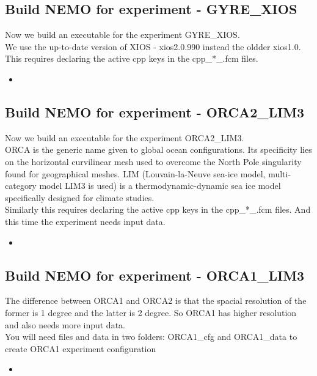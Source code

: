 \documentclass[11pt]{article}
\newcommand{\insertcode}[2]{\begin{itemize}\item[]\end{itemize}} %
\begin{document}
\subsection{Build NEMO for experiment - GYRE\_XIOS}
Now we build an executable for the experiment GYRE\_XIOS.\\
We use the up-to-date version of XIOS - xios\/2.0.990 instead the oldder xios\/1.0. This requires declaring the active cpp keys in the cpp\_*\_.fcm files.
\insertcode{"./launch_GYRE_XIOS.bash"}{} %
\subsection{Build NEMO for experiment - ORCA2\_LIM3}
Now we build an executable for the experiment ORCA2\_LIM3.\\
ORCA is the generic name given to global ocean configurations. Its specificity lies on the horizontal curvilinear mesh used to overcome the North Pole singularity found for geographical meshes. LIM (Louvain-la-Neuve sea-ice model, multi-category model LIM3 is used) is a thermodynamic-dynamic sea ice model specifically designed for climate studies.\\
Similarly this requires declaring the active cpp keys in the cpp\_*\_.fcm files. And this time the experiment needs input data.
\insertcode{"./launch_ORCA2_LIM3.bash"}{} %
\subsection{Build NEMO for experiment - ORCA1\_LIM3}
The difference between ORCA1 and ORCA2 is that the spacial resolution of the former is 1 degree and the latter is 2 degree. So ORCA1 has higher resolution and also needs more input data.\\
You will need files and data in two folders: ORCA1\_cfg and ORCA1\_data to create ORCA1 experiment configuration
\insertcode{"./launch_ORCA1_LIM3.bash"}{} %
\end{document}

